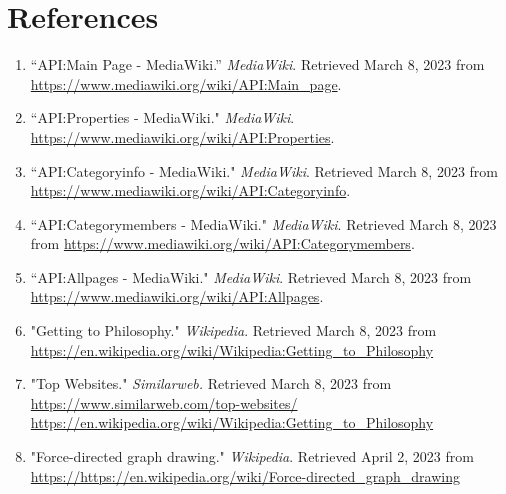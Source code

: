 \documentclass[fontsize=11pt]{article}
\begin{document}
    \section*{References}
    \begin{enumerate}
        \item “API:Main Page - MediaWiki.” \textit{MediaWiki}. Retrieved March 8, 2023 from
        \url{https://www.mediawiki.org/wiki/API:Main\_page}.
        \item “API:Properties - MediaWiki." \textit{MediaWiki}. \url{https://www.mediawiki.org/wiki/API:Properties}.
        \item “API:Categoryinfo - MediaWiki." \textit{MediaWiki}. Retrieved March 8, 2023 from
        \url{https://www.mediawiki.org/wiki/API:Categoryinfo}.
        \item “API:Categorymembers - MediaWiki." \textit{MediaWiki}. Retrieved March 8, 2023 from
        \url{https://www.mediawiki.org/wiki/API:Categorymembers}.
        \item “API:Allpages - MediaWiki." \textit{MediaWiki}. Retrieved March 8, 2023 from
        \url{https://www.mediawiki.org/wiki/API:Allpages}.
        \item "Getting to Philosophy." \textit{Wikipedia}. Retrieved March 8, 2023 from
        \url{https://en.wikipedia.org/wiki/Wikipedia:Getting_to_Philosophy}
        \item "Top Websites." \textit{Similarweb.} Retrieved March 8, 2023 from 	\url{https://www.similarweb.com/top-websites/}
        \url{https://en.wikipedia.org/wiki/Wikipedia:Getting_to_Philosophy}
        \item "Force-directed graph drawing." \textit{Wikipedia}. Retrieved April 2, 2023 from 	\url{https://https://en.wikipedia.org/wiki/Force-directed_graph_drawing}

    \end{enumerate}


    
\end{document}
